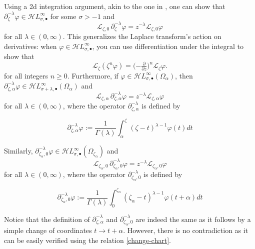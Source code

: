 \documentclass{article}
\newcommand{\singexp}[2]{\mathcal{H}L^\infty_{#1, #2}}
\newcommand{\singexpalg}[1]{\singexp{#1}{\bullet}}
\theoremstyle{definition}
\newcommand{\fracderiv}[3]{\partial^{#1}_{#2, #3}}
\newcommand{\laplace}{\mathcal{L}}
\begin{document}
Using a 2d integration argument, akin to the one in \cite[Theorem~2.39]{laplace-tfm}, one can show that $\partial^{-\lambda}_{\zeta} \varphi \in \singexpalg{\sigma}$ for some $\sigma>-1$ and
\[ \laplace_{\zeta,0}\,\partial^{-\lambda}_{\zeta} \varphi = z^{-\lambda} \laplace_{\zeta, 0} \varphi \]
for all $\lambda \in (0, \infty)$. This generalizes the Laplace transform's action on derivatives: when $\varphi \in \singexpalg{\sigma}$, you can use differentiation under the integral to show that~\cite[Theorem~1.34]{laplace-tfm}
\begin{equation}%
\laplace_\zeta (\zeta^n \varphi) = \big({-\tfrac{\partial}{\partial z}}\big)^n \laplace_\zeta \varphi.
\end{equation}
for all integers $n \ge 0$.
Furthermore, if $\varphi\in\singexpalg{\sigma}(\Omega_\alpha)$, then $\partial_{\zeta,\alpha}^{-\lambda}\varphi\in\singexpalg{\sigma+\lambda}(\Omega_\alpha)$ and 
\[ \laplace_{\zeta, \alpha}\,\fracderiv{-\lambda}{\zeta}{\alpha} \varphi = z^{-\lambda} \laplace_{\zeta, \alpha} \varphi \]
for all $\lambda \in (0, \infty)$, where the operator $\partial_{\zeta,\alpha}^{-\lambda}$ is defined by 

\begin{equation}
    \partial_{\zeta,\alpha}^{-\lambda}\varphi:=\frac{1}{\Gamma(\lambda)}\int_{\alpha}^{\zeta}(\zeta-t)^{\lambda-1} \varphi(t) dt
\end{equation}

Similarly, $\partial_{\zeta_\alpha,0}^{-\lambda}\varphi\in\singexpalg{\sigma}(\Omega_{\zeta_\alpha})$ and 
\[ \laplace_{\zeta_\alpha,0}\,\fracderiv{-\lambda}{\zeta_\alpha}{0} \varphi = z^{-\lambda} \laplace_{\zeta_\alpha,0} \varphi \]
for all $\lambda \in (0, \infty)$, where the operator $\partial_{\zeta_\alpha,0}^{-\lambda}$ is defined by 

\begin{equation}
    \partial_{\zeta_\alpha,0}^{-\lambda}\varphi:=\frac{1}{\Gamma(\lambda)}\int_{0}^{\zeta_\alpha}(\zeta_\alpha-t)^{\lambda-1} \varphi(t+\alpha) dt
\end{equation}

Notice that the definition of $\fracderiv{-\lambda}{\zeta}{\alpha}$ and $\fracderiv{-\lambda}{\zeta_\alpha}{0}$ are indeed the same as it follows by a simple change of coordinates $t\to t+\alpha$. However, there is no contradiction as it can be easily verified using the relation \eqref{change-chart}. 

\end{document}
